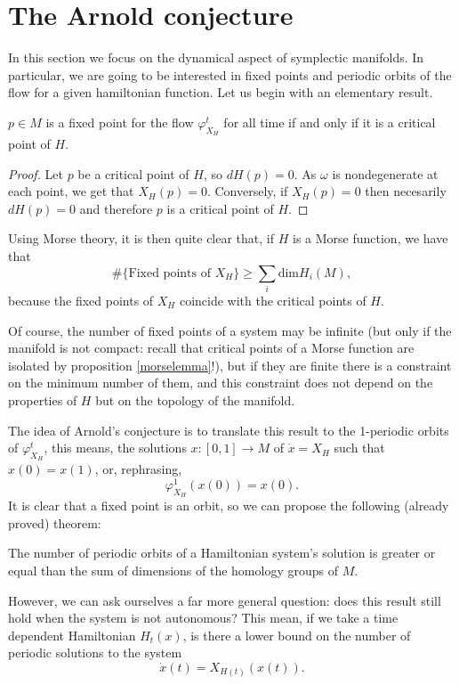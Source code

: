 \section{The Arnold conjecture}

In this section we focus on the dynamical aspect of symplectic manifolds. In particular, we are going to be interested in fixed points and periodic orbits of the flow for a given hamiltonian function. Let us begin with an elementary result.

\begin{prop}
$p \in M$ is a fixed point for the flow $\varphi_{X_H}^t$ for all time if and only if it is a critical point of $H$.
\end{prop}

\begin{proof}
Let $p$ be a critical point of $H$, so $d H(p) = 0$. As $\omega$ is nondegenerate at each point, we get that $X_H(p) = 0$. Conversely, if $X_H(p) = 0$ then necesarily $d H(p) = 0$ and therefore $p$ is a critical point of $H$.
\end{proof}

Using Morse theory, it is then quite clear that, if $H$ is a Morse function, we have that
$$\# \{\text{Fixed points of } X_H\} \geq \sum_i \text{dim}H_i(M) ,$$
because the fixed points of $X_H$ coincide with the critical points of $H$.

Of course, the number of fixed points of a system may be infinite (but only if the manifold is not compact: recall that critical points of a Morse function are isolated by proposition \ref{morselemma}!), but if they are finite there is a constraint on the minimum number of them, and this constraint does not depend on the properties of $H$ but on the topology of the manifold.

The idea of Arnold's conjecture is to translate this result to the 1-periodic orbits of $\varphi_{X_H}^t$, this means, the solutions $x : [0,1] \rightarrow M$ of $\dot{x} = X_H$ such that $x(0) = x(1)$, or, rephrasing,
$$\varphi_{X_H}^1(x(0)) = x(0) .$$
It is clear that a fixed point is an orbit, so we can propose the following (already proved) theorem:

\begin{theo}
The number of periodic orbits of a Hamiltonian system's solution is greater or equal than the sum of dimensions of the homology groups of $M$.
\end{theo}

However, we can ask ourselves a far more general question: does this result still hold when the system is not autonomous? This mean, if we take a time dependent Hamiltonian $H_t(x)$, is there a lower bound on the number of periodic solutions to the system
$$\dot{x}(t) = X_{H(t)}(x(t)) .$$

